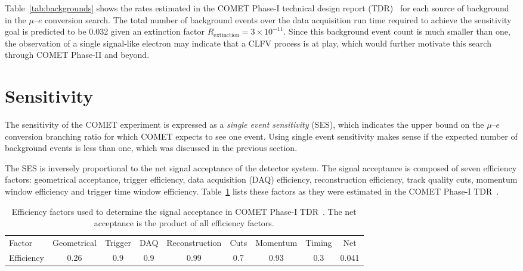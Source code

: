 Table~\ref{tab:backgrounds} shows the rates estimated in the COMET Phase-I
technical design report (TDR)~\cite[Section
10.6]{the_comet_collaboration_comet_2020} for each source of background in the
$\mu$--$e$ conversion search. The total number of background events over the
data acquisition run time required to achieve the sensitivity goal is predicted
to be 0.032 given an extinction factor $R_\mathrm{extinction} = 3 \times
10^{-11}$. Since this background event count is much smaller than one, the
observation of a single signal-like electron may indicate that a CLFV process is
at play, which would further motivate this search through COMET Phase-II and beyond.





\section{Sensitivity}\label{sec:SES}

The sensitivity of the COMET experiment is expressed as a \emph{single event
sensitivity} (SES), which indicates the upper bound on the $\mu$--$e$
conversion branching ratio for which COMET expects to see one event. Using
single event sensitivity makes sense if the expected number of background events
is less than one, which was discussed in the previous section.

The SES is inversely proportional to the net signal acceptance of the detector
system. The signal acceptance is composed of seven efficiency factors:
geometrical acceptance, trigger efficiency, data acquisition (DAQ) efficiency,
reconstruction efficiency, track quality cuts, momentum window efficiency and
trigger time window efficiency. Table~\ref{tab:acceptance} lists these factors as they
were estimated in the COMET Phase-I TDR~\cite[Section
10.1]{the_comet_collaboration_comet_2020}.

\begin{table}
    \centering
    \begin{adjustbox}{max width=1.1\textwidth,center}
    \begin{tabular}{l|ccccccc|c}
        \toprule
        Factor & Geometrical & Trigger & DAQ & Reconstruction & Cuts & Momentum
        & Timing & Net
        \\ 
        Efficiency & 0.26 & 0.9 & 0.9 & 0.99 & 0.7 & 0.93 & 0.3 & 0.041 \\
        \bottomrule
    \end{tabular}
    \end{adjustbox}
    \caption{ Efficiency factors used to determine the signal acceptance in
    COMET Phase-I TDR~\cite{the_comet_collaboration_comet_2020}. The net acceptance
    is the product of all efficiency factors.}
    \label{tab:acceptance} 
\end{table}

